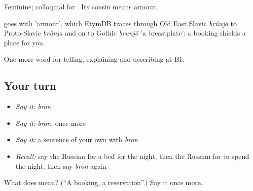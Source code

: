 Feminine; colloquial for \emph{}. Its cousin \emph{} means armour.

\begin{cousinweb}
\emph{} goes with \emph{} 'armour', which EtymDB traces through Old East Slavic \emph{brŭnja} to Proto-Slavic \emph{brŭnja} and on to Gothic \emph{brunjō} 'a breastplate': a booking shields a place for you.
\end{cousinweb}

\begin{grammarlens}[title={What you've built}]
One more word for telling, explaining and describing at B1.
\end{grammarlens}

\subsection*{Your turn}
\begin{itemize}
\raggedright
  \item \emph{Say it:} \emph{bron}
  \item \emph{Say it:} \emph{bron}, once more
  \item \emph{Say it:} a sentence of your own with \emph{bron}
  \item \emph{Recall:} say the Russian for a bed for the night, then the Russian for to spend the night, then say \emph{bron} again
\end{itemize}

\begin{tcolorbox}[breakable,colback=teal!4,colframe=teal!35!black,title={Before you move on}]
What does  mean? (\textquotedblleft{}A booking, a reservation\textquotedblright{}.) Say it once more.
\end{tcolorbox}
